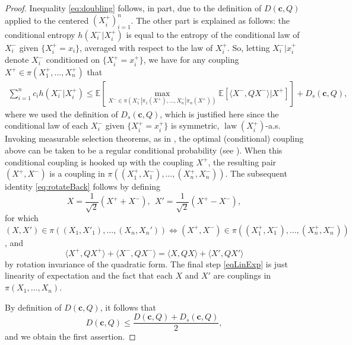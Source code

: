 \documentclass[10pt]{article}
\newcommand{\EE}{\mathbb{E}}
\begin{document}
\begin{proof}
Inequality \eqref{eq:doubling} follows, in part, due to the definition of $D(\mathbf{c},Q)$ applied to the centered   $(X_i^+)_{i=1}^n$.  The other part is explained as follows: the conditional entropy $h(X_i^-|X_i^+)$ is equal to the entropy of the conditional law of $X_i^-$ given $\{X^+_i = x_i\}$, averaged with respect to the law of $X^+_i$.  So, letting $X^-_i| x^+_i$ denote  $X^-_i$ conditioned on $\{X^+_i = x^+_i\}$, we have for any coupling $X^+ \in \pi(X^+_1 , \dots,  X^+_n )$ that 
\begin{align*}
\sum_{i=1}^n c_i   h(X^-_i|X^+_i)  \leq \EE\left[    \max_{X^- \in \pi( X^-_1|\pi_1(X^+), \dots, X^-_n|\pi_n(X^+)) }  \EE\left[   \langle X^-, Q X^-\rangle   |X^+\right] \right] + D_s(\mathbf{c},Q),
\end{align*}
where we used the definition of $D_s(\mathbf{c},Q)$, which is justified here since  the conditional law of each $X_i^-$ given $\{X^+_i = x^+_i\}$ is symmetric, $\operatorname{law}(X_i^+)$-a.s.  Invoking   measurable selection theorems, as in \cite[Cor. 5.22]{Vil2}, the optimal (conditional) coupling above   can be taken to be a regular conditional probability (see \cite[p. 42]{LCCV2}).  When this conditional coupling is hooked up with the coupling $X^+$, the resulting pair $(X^+,X^-)$ is a coupling in $\pi((X^+_1,X^-_1), \dots, (X^+_n,X^-_n))$.  The subsequent identity \eqref{eq:rotateBack} follows by defining  
$$
X = \frac{1}{\sqrt{2}}(X^+ + X^-), ~~X' = \frac{1}{\sqrt{2}}(X^+ - X^-),
$$
for which  $(X,X')  \in \pi((X_1,X'_1), \dots, (X_n,X_n')) \Leftrightarrow (X^+,X^-)\in \pi((X^+_1,X^-_1), \dots, (X^+_n,X^-_n))$, and  
$$
\langle X^+, Q X^+\rangle +   \langle X^-, Q X^- \rangle = \langle X, Q X\rangle +  \langle X', Q X' \rangle
$$
by rotation invariance of the quadratic form.   The final step \eqref{eqLinExp} is just linearity of expectation and the fact that each $X$ and $X'$ are couplings in $\pi( X_1, \dots, X_n )$.

By definition of $D(\mathbf{c},Q)$, it follows that 
$$
D(\mathbf{c},Q) \leq \frac{D(\mathbf{c},Q) + D_s(\mathbf{c},Q) }{2},
$$
and we obtain the first assertion.



\end{proof}
\end{document}
